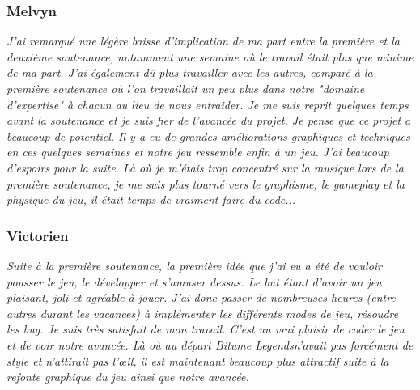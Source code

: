 \documentclass[12pt,a4paper]{article}
\newcommand{\btmlgs}{\textsl{Bitume Legends}}
\begin{document}
            \subsubsection{Melvyn}
                \textit{J'ai remarqué une légère baisse d'implication de ma part entre la 
                première et la deuxième soutenance, notamment une semaine où le 
                travail était plus que minime de ma part. J'ai également dû plus 
                travailler avec les autres, comparé à la première soutenance où l'on
                travaillait un peu plus dans notre "domaine d'expertise" à chacun 
                au lieu de nous entraider. Je me suis reprit quelques temps avant la
                soutenance et je suis fier de l'avancée du projet. Je pense que ce projet
                a beaucoup de potentiel. Il y a eu de grandes améliorations graphiques et
                techniques en ces quelques semaines et notre jeu ressemble enfin à un jeu.
                J'ai beaucoup d'espoirs pour la suite. Là où je m'étais trop concentré sur
                la musique lors de la première soutenance, je me suis plus tourné vers
                le graphisme, le \textsl{gameplay} et la physique du jeu, il était temps de vraiment
                faire du code...}

            \subsubsection{Victorien}
                \textit{Suite à la première soutenance, la première idée que j'ai eu a été
                de vouloir pousser le jeu, le développer et s'amuser dessus. Le but étant
                d'avoir un jeu plaisant, joli et agréable à jouer. J'ai donc passer
                de nombreuses heures (entre autres durant les vacances) à implémenter
                les différents modes de jeu, résoudre les \textsl{bug}. Je suis très satisfait
                de mon travail. C'est un vrai plaisir de coder le jeu et de voir notre
                avancée. Là où au départ \btmlgs n'avait pas forcément de style et
                n'attirait pas l'œil, il est maintenant beaucoup plus attractif suite à
                la refonte graphique du jeu ainsi que notre avancée. }
\end{document}
